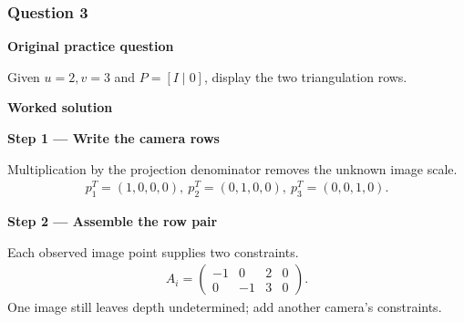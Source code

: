 \documentclass[letterpaper,11pt,english,openany,oneside]{jupyterBook}
\begin{document}
\par\medskip


\subsubsection{Question 3}
\label{\detokenize{lectures/lecture06/tldr:question-3}}
\par\medskip\textbf{Original practice question}\par\smallskip

\sphinxAtStartPar
Given \(u=2,v=3\) and \(P=[I\mid0]\), display the two triangulation rows.

\par\medskip

\par\medskip
\textbf{Worked solution}\par\smallskip

\par\medskip{}
{\color{QuizStepRed}\bfseries Step 1 — Write the camera rows}\par\smallskip

\sphinxAtStartPar
{} Multiplication by the projection denominator removes the unknown image scale.
{\color{QuizMathBlue} \begin{equation*}
\begin{split}p_1^T=(1,0,0,0),\ p_2^T=(0,1,0,0),\ p_3^T=(0,0,1,0).\end{split}
\end{equation*}}
\par

\par\medskip{}
{\color{QuizStepRed}\bfseries Step 2 — Assemble the row pair}\par\smallskip

\sphinxAtStartPar
{} Each observed image point supplies two constraints.
{\color{QuizMathBlue} \begin{equation*}
\begin{split}A_i=\begin{pmatrix}-1&0&2&0\\0&-1&3&0\end{pmatrix}.\end{split}
\end{equation*}}
\sphinxAtStartPar
One image still leaves depth undetermined; add another camera’s constraints.

\par
\end{document}

